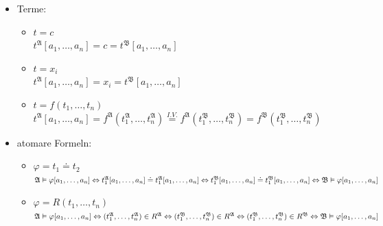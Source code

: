 \documentclass[a4paper]{scrartcl}
\begin{document}
        \begin{itemize}
            \item Terme:\\
                \begin{itemize}
                    \item $t = c$\\
                        $t^{\mathfrak{A}}[a_1,\dots,a_n] = c = t^{\mathfrak{B}}[a_1,\dots,a_n]$\\
                    \item $t = x_i$\\
                        $t^{\mathfrak{A}}[a_1,\dots,a_n] = x_i = t^{\mathfrak{B}}[a_1,\dots,a_n]$\\
                    \item $t = f(t_1,\dots,t_n)$
                        $t^{\mathfrak{A}}[a_1,\dots,a_n] = f^{\mathfrak{A}}(t_1^{\mathfrak{A}},\dots,t_n^{\mathfrak{A}})
                        \overset{I.V.}{=} f^{\mathfrak{A}}(t_1^{\mathfrak{B}},\dots,t_n^{\mathfrak{B}})
                        = f^{\mathfrak{B}}(t_1^{\mathfrak{B}},\dots,t_n^{\mathfrak{B}})$
                \end{itemize}

\newpage

            \item atomare Formeln:\\
                \begin{itemize}
                    \item $\varphi = t_1 \doteq t_2$\\
                        $\mathfrak{A} \vDash \varphi[a_1,\dots,a_n] \Leftrightarrow t_1^{\mathfrak{A}}[a_1,\dots,a_n] \doteq t_1^{\mathfrak{A}}[a_1,\dots,a_n]\\
                        \Leftrightarrow t_1^{\mathfrak{B}}[a_1,\dots,a_n] \doteq t_1^{\mathfrak{B}}[a_1,\dots,a_n]
                        \Leftrightarrow \mathfrak{B} \vDash \varphi[a_1,\dots,a_n]$\\
                    \item $\varphi = R(t_1,\dots,t_n)$\\
                        $\mathfrak{A} \vDash \varphi[a_1,\dots,a_n] \Leftrightarrow (t_1^{\mathfrak{A}},\dots,t_n^{\mathfrak{A}}) \in R^{\mathfrak{A}}\\
                        \Leftrightarrow (t_1^{\mathfrak{B}},\dots,t_n^{\mathfrak{B}}) \in R^{\mathfrak{A}}
                        \Leftrightarrow (t_1^{\mathfrak{B}},\dots,t_n^{\mathfrak{B}}) \in R^{\mathfrak{B}}
                        \Leftrightarrow \mathfrak{B} \vDash \varphi[a_1,\dots,a_n]$\\
                \end{itemize}


\end{itemize}
\end{document}
